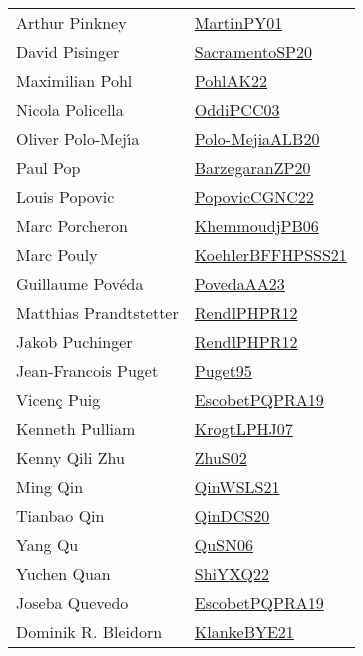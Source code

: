 {\begin{longtable}{p{4cm}p{20cm}}
Arthur Pinkney & \href{articles/MartinPY01.pdf}{MartinPY01}\cite{MartinPY01} \\
David Pisinger & \href{articles/SacramentoSP20.pdf}{SacramentoSP20}\cite{SacramentoSP20} \\
Maximilian Pohl & \href{articles/PohlAK22.pdf}{PohlAK22}\cite{PohlAK22} \\
Nicola Policella & \href{papers/OddiPCC03.pdf}{OddiPCC03}\cite{OddiPCC03} \\
Oliver Polo{-}Mej{\'{\i}}a & \href{articles/Polo-MejiaALB20.pdf}{Polo-MejiaALB20}\cite{Polo-MejiaALB20} \\
Paul Pop & \href{papers/BarzegaranZP20.pdf}{BarzegaranZP20}\cite{BarzegaranZP20} \\
Louis Popovic & \href{papers/PopovicCGNC22.pdf}{PopovicCGNC22}\cite{PopovicCGNC22} \\
Marc Porcheron & \href{papers/KhemmoudjPB06.pdf}{KhemmoudjPB06}\cite{KhemmoudjPB06} \\
Marc Pouly & \href{articles/KoehlerBFFHPSSS21.pdf}{KoehlerBFFHPSSS21}\cite{KoehlerBFFHPSSS21} \\
Guillaume Pov{\'{e}}da & \href{papers/PovedaAA23.pdf}{PovedaAA23}\cite{PovedaAA23} \\
Matthias Prandtstetter & \href{papers/RendlPHPR12.pdf}{RendlPHPR12}\cite{RendlPHPR12} \\
Jakob Puchinger & \href{papers/RendlPHPR12.pdf}{RendlPHPR12}\cite{RendlPHPR12} \\
Jean{-}Francois Puget & \href{papers/Puget95.pdf}{Puget95}\cite{Puget95} \\
Vicen{\c{c}} Puig & \href{articles/EscobetPQPRA19.pdf}{EscobetPQPRA19}\cite{EscobetPQPRA19} \\
Kenneth Pulliam & \href{papers/KrogtLPHJ07.pdf}{KrogtLPHJ07}\cite{KrogtLPHJ07} \\
Kenny Qili Zhu & \href{papers/ZhuS02.pdf}{ZhuS02}\cite{ZhuS02} \\
Ming Qin & \href{articles/QinWSLS21.pdf}{QinWSLS21}\cite{QinWSLS21} \\
Tianbao Qin & \href{articles/QinDCS20.pdf}{QinDCS20}\cite{QinDCS20} \\
Yang Qu & \href{papers/QuSN06.pdf}{QuSN06}\cite{QuSN06} \\
Yuchen Quan & \href{articles/ShiYXQ22.pdf}{ShiYXQ22}\cite{ShiYXQ22} \\
Joseba Quevedo & \href{articles/EscobetPQPRA19.pdf}{EscobetPQPRA19}\cite{EscobetPQPRA19} \\
Dominik R. Bleidorn & \href{papers/KlankeBYE21.pdf}{KlankeBYE21}\cite{KlankeBYE21} \\

\end{longtable}}

